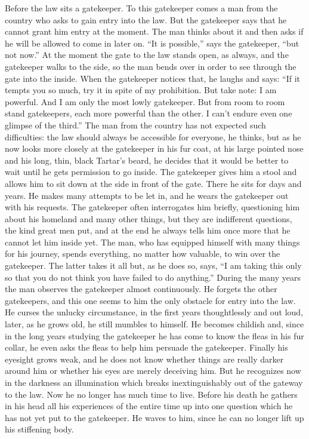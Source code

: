 \documentclass[11pt,letterpaper,twoside]{article}
\begin{document}
Before the law sits a gatekeeper. To this gatekeeper comes a man from
the country who asks to gain entry into the law. But the gatekeeper says
that he cannot grant him entry at the moment. The man thinks about it
and then asks if he will be allowed to come in later on. ``It is
possible,'' says the gatekeeper, ``but not now.'' At the moment the gate
to the law stands open, as always, and the gatekeeper walks to the side,
so the man bends over in order to see through the gate into the inside.
When the gatekeeper notices that, he laughs and says: ``If it tempts you
so much, try it in spite of my prohibition. But take note: I am
powerful. And I am only the most lowly gatekeeper. But from room to room
stand gatekeepers, each more powerful than the other. I can't endure
even one glimpse of the third.'' The man from the country has not
expected such difficulties: the law should always be accessible for
everyone, he thinks, but as he now looks more closely at the gatekeeper
in his fur coat, at his large pointed nose and his long, thin, black
Tartar's beard, he decides that it would be better to wait until he gets
permission to go inside. The gatekeeper gives him a stool and allows him
to sit down at the side in front of the gate. There he sits for days and
years. He makes many attempts to be let in, and he wears the gatekeeper
out with his requests. The gatekeeper often interrogates him briefly,
questioning him about his homeland and many other things, but they are
indifferent questions, the kind great men put, and at the end he always
tells him once more that he cannot let him inside yet. The man, who has
equipped himself with many things for his journey, spends everything, no
matter how valuable, to win over the gatekeeper. The latter takes it all
but, as he does so, says, ``I am taking this only so that you do not
think you have failed to do anything.'' During the many years the man
observes the gatekeeper almost continuously. He forgets the other
gatekeepers, and this one seems to him the only obstacle for entry into
the law. He curses the unlucky circumstance, in the first years
thoughtlessly and out loud, later, as he grows old, he still mumbles to
himself. He becomes childish and, since in the long years studying the
gatekeeper he has come to know the fleas in his fur collar, he even asks
the fleas to help him persuade the gatekeeper. Finally his eyesight
grows weak, and he does not know whether things are really darker around
him or whether his eyes are merely deceiving him. But he recognizes now
in the darkness an illumination which breaks inextinguishably out of the
gateway to the law. Now he no longer has much time to live. Before his
death he gathers in his head all his experiences of the entire time up
into one question which he has not yet put to the gatekeeper. He waves
to him, since he can no longer lift up his stiffening body.
\end{document}
